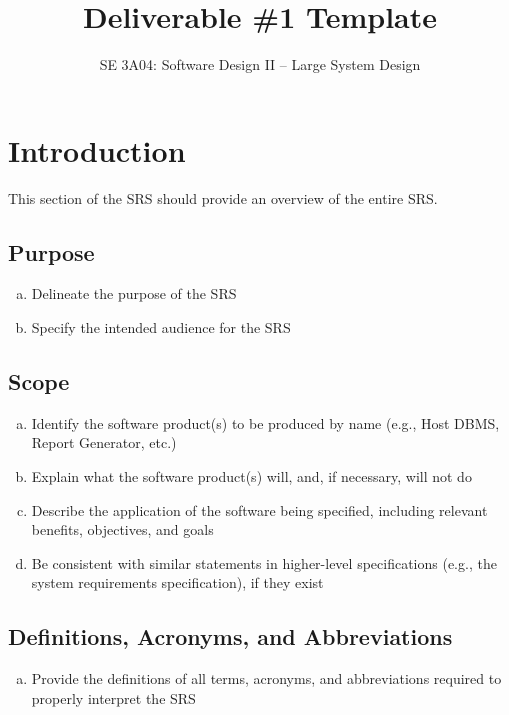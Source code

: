 \documentclass[]{article}
\title{Deliverable \#1 Template}
\author{SE 3A04: Software Design II -- Large System Design}
\date{}
\begin{document}
\maketitle	

\section{Introduction}
\label{sec:introduction}

This section of the SRS should provide an overview of the entire SRS.

\subsection{Purpose}
\label{sub:purpose}
\begin{enumerate}[a)]
	\item Delineate the purpose of the SRS
	\item Specify the intended audience for the SRS
\end{enumerate}

\subsection{Scope}
\label{sub:scope}
\begin{enumerate}[a)]
	\item Identify the software product(s) to be produced by name (e.g., Host DBMS, Report Generator, etc.)
	\item Explain what the software product(s) will, and, if necessary, will not do
	\item Describe the application of the software being specified, including relevant benefits, objectives, and goals
	\item Be consistent with similar statements in higher-level specifications (e.g., the system requirements specification), if they exist
\end{enumerate}

\subsection{Definitions, Acronyms, and Abbreviations}
\label{sub:definitions_acronyms_and_abbreviations}
\begin{enumerate}[a)]
	\item Provide the definitions of all terms, acronyms, and abbreviations required to properly interpret the SRS
\end{enumerate}
\end{document}
